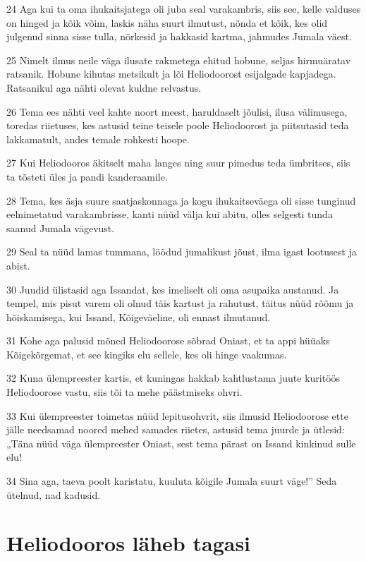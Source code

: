 \par 24 Aga kui ta oma ihukaitsjatega oli juba seal varakambris, siis see, kelle valduses on hinged ja kõik võim, laskis näha suurt ilmutust, nõnda et kõik, kes olid julgenud sinna sisse tulla, nõrkesid ja hakkasid kartma, jahmudes Jumala väest.
\par 25 Nimelt ilmus neile väga ilusate rakmetega ehitud hobune, seljas hirmuäratav ratsanik. Hobune kihutas metsikult ja lõi Heliodoorost esijalgade kapjadega. Ratsanikul aga nähti olevat kuldne relvastus.
\par 26 Tema ees nähti veel kahte noort meest, haruldaselt jõulisi, ilusa välimusega, toredas riietuses, kes astusid teine teisele poole Heliodoorost ja piitsutasid teda lakkamatult, andes temale rohkesti hoope.
\par 27 Kui Heliodooros äkitselt maha langes ning suur pimedus teda ümbritses, siis ta tõsteti üles ja pandi kanderaamile.
\par 28 Tema, kes äsja suure saatjaskonnaga ja kogu ihukaitseväega oli sisse tunginud eelnimetatud varakambrisse, kanti nüüd välja kui abitu, olles selgesti tunda saanud Jumala vägevust.
\par 29 Seal ta nüüd lamas tummana, löödud jumalikust jõust, ilma igast lootusest ja abist.
\par 30 Juudid ülistasid aga Issandat, kes imeliselt oli oma asupaika austanud. Ja tempel, mis pisut varem oli olnud täis kartust ja rahutust, täitus nüüd rõõmu ja hõiskamisega, kui Issand, Kõigeväeline, oli ennast ilmutanud.
\par 31 Kohe aga palusid mõned Heliodoorose sõbrad Oniast, et ta appi hüüaks Kõigekõrgemat, et see kingiks elu sellele, kes oli hinge vaakumas.
\par 32 Kuna ülempreester kartis, et kuningas hakkab kahtlustama juute kuritöös Heliodoorose vastu, siis tõi ta mehe päästmiseks ohvri.
\par 33 Kui ülempreester toimetas nüüd lepitusohvrit, siis ilmusid Heliodoorose ette jälle needsamad noored mehed samades riietes, astusid tema juurde ja ütlesid: „Täna nüüd väga ülempreester Oniast, sest tema pärast on Issand kinkinud sulle elu!
\par 34 Sina aga, taeva poolt karistatu, kuuluta kõigile Jumala suurt väge!” Seda ütelnud, nad kadusid.


\section*{Heliodooros läheb tagasi}

